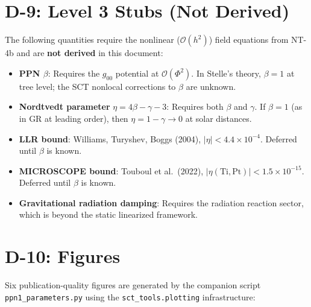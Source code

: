 \documentclass[11pt,a4paper]{article}
\newcommand{\order}{\mathcal{O}}
\begin{document}
\section{D-9: Level 3 Stubs (Not Derived)}
\label{sec:level3}

The following quantities require the nonlinear ($\order(h^2)$) field
equations from NT-4b and are \textbf{not derived} in this document:

\begin{itemize}
  \item \textbf{PPN $\beta$}:  Requires the $g_{00}$ potential at
    $\order(\Phi^2)$.  In Stelle's theory, $\beta = 1$ at tree level;
    the SCT nonlocal corrections to $\beta$ are unknown.

  \item \textbf{Nordtvedt parameter} $\eta = 4\beta - \gamma - 3$:
    Requires both $\beta$ and $\gamma$.  If $\beta = 1$ (as in GR at
    leading order), then $\eta = 1 - \gamma \to 0$ at solar distances.

  \item \textbf{LLR bound}: Williams, Turyshev, Boggs (2004),
    $|\eta| < 4.4 \times 10^{-4}$.  Deferred until $\beta$ is known.

  \item \textbf{MICROSCOPE bound}: Touboul et al.\ (2022),
    $|\eta(\mathrm{Ti}, \mathrm{Pt})| < 1.5 \times 10^{-15}$.
    Deferred until $\beta$ is known.

  \item \textbf{Gravitational radiation damping}: Requires the radiation
    reaction sector, which is beyond the static linearized framework.
\end{itemize}


\section{D-10: Figures}
\label{sec:figures}

Six publication-quality figures are generated by the companion script
\texttt{ppn1\_parameters.py} using the \texttt{sct\_tools.plotting}
infrastructure:
\end{document}
